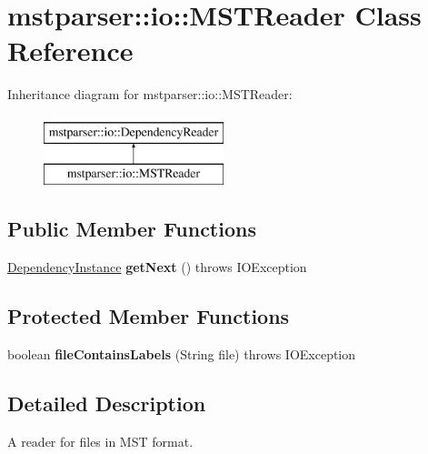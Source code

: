 \hypertarget{classmstparser_1_1io_1_1MSTReader}{
\section{mstparser::io::MSTReader Class Reference}
\label{classmstparser_1_1io_1_1MSTReader}
}
Inheritance diagram for mstparser::io::MSTReader:\begin{figure}[H]
\begin{center}
\leavevmode
\includegraphics[height=2cm]{classmstparser_1_1io_1_1MSTReader}
\end{center}
\end{figure}
\subsection*{Public Member Functions}
\begin{DoxyCompactItemize}
\item 
\hypertarget{classmstparser_1_1io_1_1MSTReader_ad3f8f60a6c186fa6292ba5e7319e51f0}{
\hyperlink{classmstparser_1_1DependencyInstance}{DependencyInstance} {\bfseries getNext} ()  throws IOException }
\label{classmstparser_1_1io_1_1MSTReader_ad3f8f60a6c186fa6292ba5e7319e51f0}

\end{DoxyCompactItemize}
\subsection*{Protected Member Functions}
\begin{DoxyCompactItemize}
\item 
\hypertarget{classmstparser_1_1io_1_1MSTReader_a6fbb61befba770c62bc50d71e674f73d}{
boolean {\bfseries fileContainsLabels} (String file)  throws IOException }
\label{classmstparser_1_1io_1_1MSTReader_a6fbb61befba770c62bc50d71e674f73d}

\end{DoxyCompactItemize}


\subsection{Detailed Description}
A reader for files in MST format.


